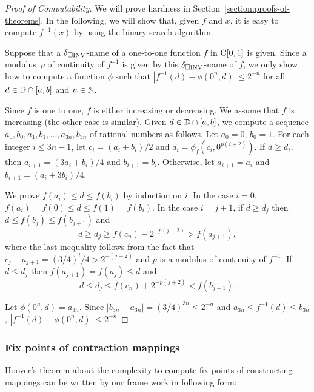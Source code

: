 \documentclass[envcountsame,orivec,oribibl]{llncs}
\begin{document}
\begin{proof}[Proof of Computability]
We will prove hardness in Section~\ref{section:proofs-of-theorems}.
In the following, we will show that, 
given $f$ and $x$, 
it is easy to compute $f^{-1}(x)$ by using the binary search algorithm.

Suppose that a $\delta _{\square \mathrm{INV}}$-name of a one-to-one function $f$ in $\mathrm C [0, 1]$ is given. 
Since a modulus~$p$ of continuity of $f ^{-1}$ is given by this $\delta _{\square \mathrm{INV}}$-name of $f$,
we only show how to compute a function $\phi$ such that 
$|f^{-1}(d) - \phi(0^n, d)| \le 2^{-n}$ for all $d \in \mathbb D \cap [a, b]$ and $n \in \mathbb N$.

Since $f$ is one to one, $f$ is either increasing or decreasing. 
We assume that $f$ is increasing (the other case is similar).
Given $d \in \mathbb D \cap [a, b]$, 
we compute a sequence  $a_0, b_0, a_1,b_1, \dots, a_{3n}, b_{3n}$ of rational numbers as follows.
Let $a_0 = 0$, $b_0 = 1$.
For each integer $i \le 3n-1$,
let $c_i = (a_i+b_i)/2$ and $d_i = \phi_f(c_i, 0^{p(i+2)})$.
If $d \ge d_i$, then $a_{i+1} = (3a_i+b_i)/4$ and $b_{i+1} = b_i$. 
Otherwise, let $a_{i+1} = a_i$ and $b_{i+1} = (a_i+3b_i)/4$.

We prove $f(a_i) \leq d \leq f(b_i)$ by induction on $i$.
In the case $i = 0$, $f(a_i) = f(0) \le d \le f(1) = f(b_i)$.
In the case $i=j+1$, if $d \ge d_j$ then $d \le f(b_j) \le f(b_{j+1})$ and
\begin{equation}
 d \ge d_j \ge f(c_n) - 2^{-p(j+2)} > f(a_{j+1}),
\end{equation}
where the last inequality follows from the fact that $c_j - a_{j+1} = (3/4)^i/4 > 2^{-(j+2)}$ and $p$ is a modulus of continuity of $f^{-1}$.
If $d \le d_j$ then $f(a_{j+1}) = f(a_j) \le d$ and 
\begin{equation}
 d \le d_j \le f(c_n) + 2^{-p(j+2)} < f(b_{j+1}).
\end{equation}

Let $\phi(0^n, d) = a_{3n}$.
Since $|b_{3n} - a_{3n}| = (3/4)^{3n} \le 2^{-n}$ and
$a_{3n} \le f^{-1}(d) \le b_{3n}$,
$|f^{-1}(d) - \phi(0^n, d)| \le 2^{-n}$
\end{proof}

\subsubsection{Fix points of contraction mappings}

Hoover's theorem about the complexity to compute fix points
of constructing mappings can be written by our frame work in following form:
\end{document}

